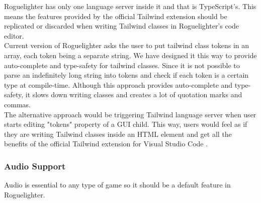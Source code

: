 \documentclass{article}
\begin{document}
Roguelighter has only one language server inside it and that is TypeScript's. This means the features provided by the official Tailwind extension should be replicated or discarded when writing Tailwind classes in Roguelighter's code editor.\\

Current version of Roguelighter asks the user to put tailwind class tokens in an array, each token being a separate string. We have designed it this way to provide auto-complete and type-safety for tailwind classes. Since it is not possible to parse an indefinitely long string into tokens and check if each token is a certain type at compile-time. Although this approach provides auto-complete and type-safety, it slows down writing classes and creates a lot of quotation marks and commas.\\

The alternative approach would be triggering Tailwind language server when user starts editing "tokens" property of a GUI child. This way, users would feel as if they are writing Tailwind classes inside an HTML element and get all the benefits of the official Tailwind extension for Visual Studio Code \cite{tailwind-vscode}. 
\subsubsection{Audio Support}
Audio is essential to any type of game so it should be a default feature in Roguelighter.
\printbibliography
\listoffigures
\end{document}
